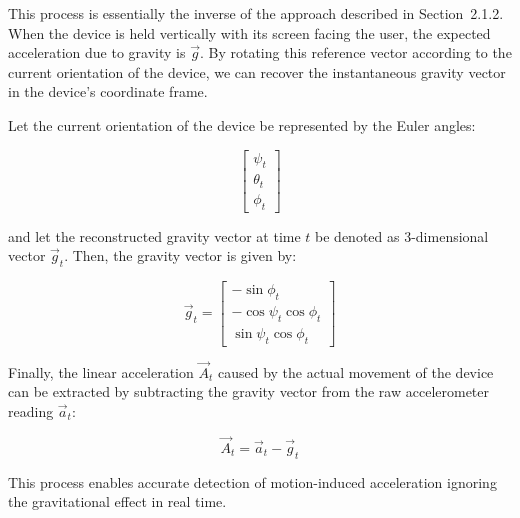 \documentclass{article}
\begin{document}
    This process is essentially the inverse of the approach described in Section~2.1.2.
    When the device is held vertically with its screen facing the user, the expected
    acceleration due to gravity is $\vec{g}$. By rotating this reference vector
    according to the current orientation of the device, we can recover the instantaneous
    gravity vector in the device's coordinate frame.

    Let the current orientation of the device be represented by the Euler angles:

    \[
        \begin{bmatrix}
            \psi_{t}   \\
            \theta_{t} \\
            \phi_{t}
        \end{bmatrix}
    \]

    and let the reconstructed gravity vector at time $t$ be denoted as 3-dimensional
    vector $\vec{g}_{t}$. Then, the gravity vector is given by:

    \[
        \vec{g}_{t}=
        \begin{bmatrix}
            -\sin\phi_{t}             \\
            -\cos\psi_{t}\cos\phi_{t} \\
            \sin\psi_{t}\cos\phi_{t}
        \end{bmatrix}
    \]

    Finally, the linear acceleration $\vec{A}_{t}$ caused by the actual movement
    of the device can be extracted by subtracting the gravity vector from the
    raw accelerometer reading $\vec{a}_{t}$:

    \[
        \vec{A}_{t}= \vec{a}_{t}- \vec{g}_{t}
    \]

    This process enables accurate detection of motion-induced acceleration ignoring
    the gravitational effect in real time.
\end{document}
